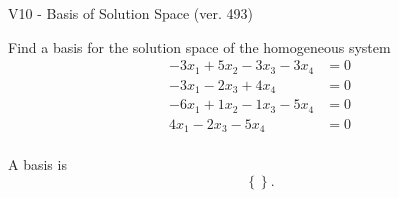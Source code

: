 \begin{exercise}
  \begin{exerciseTitle}V10 - Basis of Solution Space (ver. 493)\end{exerciseTitle}
  \begin{exerciseStatement}
    Find a basis for the solution space of the homogeneous system 
\begin{align*}
 -3 x_ 1 + 5 x_ 2 -3 x_ 3 -3 x_ 4 &= 0  \\ 
  -3 x_ 1 -2 x_ 3 + 4 x_ 4 &= 0  \\ 
  -6 x_ 1 + 1 x_ 2 -1 x_ 3 -5 x_ 4 &= 0  \\ 
  4 x_ 1 -2 x_ 3 -5 x_ 4 &= 0  \\ 
 \end{align*}


 
  \end{exerciseStatement}

  \begin{exerciseAnswer}
   A basis is   
\[\left\{\right\}.\]

  


  \end{exerciseAnswer}
\end{exercise}